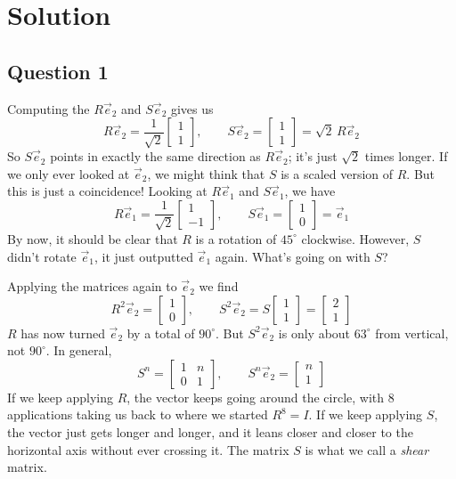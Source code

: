 \documentclass[11pt]{article}
\begin{document}
\section*{Solution}
\subsection*{Question 1}
Computing the $R\vec{e}_2$ and $S\vec{e}_2$ gives us
\[
R\vec{e}_2=\frac{1}{\sqrt{2}}\begin{bmatrix}1\\1\end{bmatrix},\qquad S\vec{e}_2=\begin{bmatrix}1\\1\end{bmatrix}=\sqrt{2}\,R\vec{e}_2
\]
So $S\vec{e}_2$ points in exactly the same direction as $R\vec{e}_2$; it's just $\sqrt{2}$ times longer. If we only ever looked at $\vec{e}_2$, we might think that $S$ is a scaled version of $R$. But this is just a coincidence! Looking at $R\vec{e}_1$ and $S\vec{e}_1$, we have
\[
R\vec{e}_1=\frac{1}{\sqrt{2}}\begin{bmatrix}1\\-1\end{bmatrix},\qquad S\vec{e}_1=\begin{bmatrix}1\\0\end{bmatrix}=\vec{e}_1
\]
By now, it should be clear that $R$ is a rotation of $45^\circ$ clockwise. However, $S$ didn't rotate $\vec{e}_1$, it just outputted $\vec{e}_1$ again. What's going on with $S$?

Applying the matrices again to $\vec{e}_2$ we find
\[
R^2\vec{e}_2=\begin{bmatrix}1\\0\end{bmatrix},\qquad S^2\vec{e}_2=S\begin{bmatrix}1\\1\end{bmatrix}=\begin{bmatrix}2\\1\end{bmatrix}
\]
$R$ has now turned $\vec{e}_2$ by a total of $90^\circ$. But $S^2\vec{e}_2$ is only about $63^\circ$ from vertical, not $90^\circ$. In general,
\[
S^n=\begin{bmatrix}1 & n\\0 & 1\end{bmatrix},\qquad S^n\vec{e}_2=\begin{bmatrix}n\\1\end{bmatrix}
\]
If we keep applying $R$, the vector keeps going around the circle, with 8 applications taking us back to where we started $R^8=I$. If we keep applying $S$, the vector just gets longer and longer, and it leans closer and closer to the horizontal axis without ever crossing it. The matrix $S$ is what we call a \textit{shear} matrix.
\end{document}
